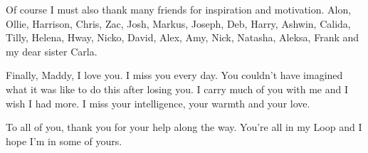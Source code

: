Of course I must also thank many friends for inspiration and motivation. Alon, Ollie, Harrison, Chris, Zac, Josh, Markus, Joseph, Deb, Harry, Ashwin, Calida, Tilly, Helena, Hway, Nicko, David, Alex, Amy, Nick, Natasha, Aleksa, Frank and my dear sister Carla.

Finally, Maddy, I love you. I miss you every day. You couldn't have imagined what it was like to do this after losing you. I carry much of you with me and I wish I had more. I miss your intelligence, your warmth and your love.

To all of you, thank you for your help along the way. You're all in my Loop \cite{hofstadter2007} and I hope I'm in some of yours.

